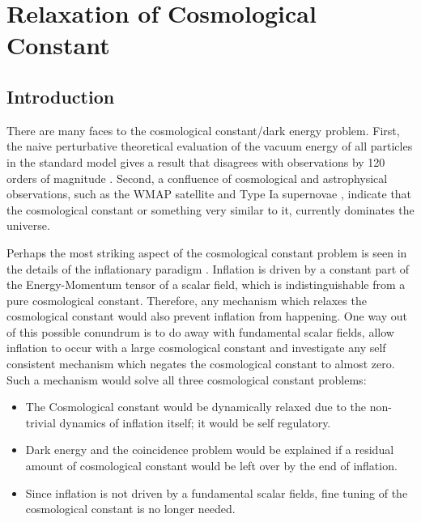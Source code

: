 \chapter{Relaxation of Cosmological Constant}

\begin{doublespace}

\section{Introduction}

There are many faces to the cosmological constant/dark energy
problem.  First, the naive perturbative theoretical evaluation of
the vacuum energy of all particles in the standard model gives a
result that disagrees with observations by 120 orders of magnitude
\cite{Carroll2001Cosmological}. Second, a confluence of cosmological and
astrophysical observations, such as the WMAP satellite
\cite{Spergel2006Wilkinson} and Type Ia supernovae \cite{Astier2006Supernova},
indicate that the cosmological constant or something very similar to
it, currently dominates the universe.

Perhaps the most striking aspect of the cosmological constant
problem is seen in the details of the inflationary
paradigm \cite{Brandenberger2001Principles}. Inflation is driven by a
constant part of the Energy-Momentum tensor of a scalar field, which
is indistinguishable from a pure cosmological constant.  Therefore,
any mechanism which relaxes the cosmological constant would also
prevent inflation from happening. One way out of this possible
conundrum is to do away with fundamental scalar fields, allow
inflation to occur with a large cosmological constant and
investigate any self consistent mechanism which negates the
cosmological constant to almost zero.  Such a mechanism would solve
all three cosmological constant problems:


\begin{itemize}

\item The Cosmological constant would be dynamically relaxed due to the non-trivial dynamics of
inflation itself; it would be self regulatory.

\item Dark energy and the coincidence problem would be explained if a residual amount of
cosmological constant would be left over by the end of inflation.

\item Since inflation is not driven by a fundamental scalar fields, fine tuning of the cosmological
constant is no longer needed.


\end{itemize}
\end{doublespace}
